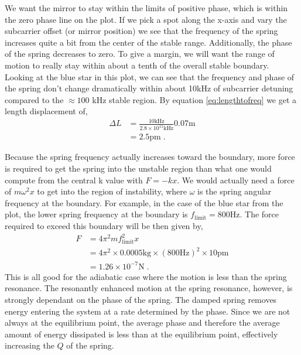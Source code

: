 We want the mirror to stay within the limits of positive phase, which is within
the zero phase line on the plot.
If we pick a spot along the x-axis and vary the subcarrier offset
(or mirror position) we see that the frequency of the spring increases quite a
bit from the center of the stable range.
Additionally, the phase of the spring decreases to zero.
To give a margin, we will want the range of motion to really stay within about
a tenth of the overall stable boundary.
Looking at the blue star in this plot, we can see that the frequency and phase
of the spring don't change dramatically within about 10kHz of subcarrier
detuning compared to the $\approx 100$ kHz stable region. By equation
\eqref{eq:lengthtofreq} we get a length displacement of,
\begin{align}
\Delta L &= \frac{10\mathrm{kHz}}{2.8\times 10^{11}\mathrm{kHz}}
    0.07\mathrm{m} \nonumber \\
  &= 2.5 \mathrm{pm} \;.
\end{align}

Because the spring frequency actually increases toward the boundary, more force
is required to get the spring into the unstable region than what one would
compute from the central k value with $F=-kx$.
We would actually need a force of $m\omega^2 x$ to get into the region of
instability, where $\omega$ is the spring angular frequency at the boundary.
For example, in the case of the blue star from the plot, the lower spring
frequency at the boundary is $f_\mathrm{limit} = 800\mathrm{Hz}$.
The force required to exceed this boundary will be then given by,
\begin{align*}
F &= 4\pi^2mf_\mathrm{limit}^2x \\
  &= 4\pi^2 \times 0.0005 \mathrm{kg} \times (800\mathrm{Hz})^2 \times 10
     \mathrm{pm} \\
  &= 1.26 \times 10^{-7} \mathrm{N} \;.
\end{align*}
This is all good for the adiabatic case where the motion is less than the spring
resonance.
The resonantly enhanced motion at the spring resonance, however, is strongly
dependant on the phase of the spring.
The damped spring removes energy entering the system at a rate determined by
the phase.
Since we are not always at the equilibrium point, the average phase and
therefore the average amount of energy dissipated is less than at the
equilibrium point, effectively increasing the $Q$ of the spring.

